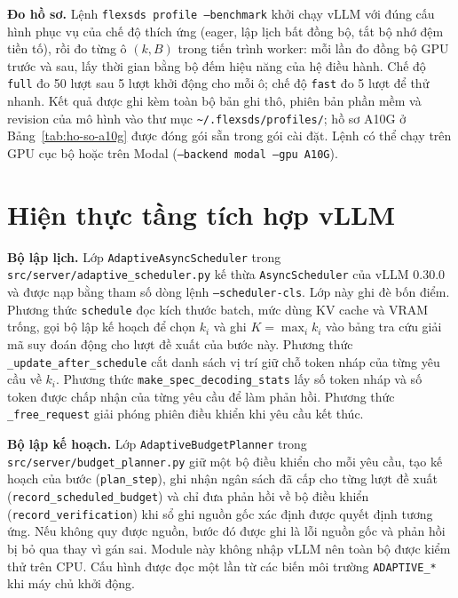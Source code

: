 \textbf{Đo hồ sơ.} Lệnh \texttt{flexsds profile --benchmark} khởi chạy vLLM với đúng cấu hình phục vụ của chế độ thích ứng (eager, lập lịch bất đồng bộ, tắt bộ nhớ đệm tiền tố), rồi đo từng ô $(k, B)$ trong tiến trình worker: mỗi lần đo đồng bộ GPU trước và sau, lấy thời gian bằng bộ đếm hiệu năng của hệ điều hành. Chế độ \texttt{full} đo 50 lượt sau 5 lượt khởi động cho mỗi ô; chế độ \texttt{fast} đo 5 lượt để thử nhanh. Kết quả được ghi kèm toàn bộ bản ghi thô, phiên bản phần mềm và revision của mô hình vào thư mục \texttt{\textasciitilde/.flexsds/profiles/}; hồ sơ A10G ở Bảng~\ref{tab:ho-so-a10g} được đóng gói sẵn trong gói cài đặt. Lệnh có thể chạy trên GPU cục bộ hoặc trên Modal (\texttt{--backend modal --gpu A10G}).

\section{Hiện thực tầng tích hợp vLLM}
\label{sec:ht-tich-hop}

\textbf{Bộ lập lịch.} Lớp \texttt{AdaptiveAsyncScheduler} trong \texttt{src/server/adaptive\_scheduler.py} kế thừa \texttt{AsyncScheduler} của vLLM 0.30.0 và được nạp bằng tham số dòng lệnh \texttt{--scheduler-cls}. Lớp này ghi đè bốn điểm. Phương thức \texttt{schedule} đọc kích thước batch, mức dùng KV cache và VRAM trống, gọi bộ lập kế hoạch để chọn $k_i$ và ghi $K=\max_i k_i$ vào bảng tra cứu giải mã suy đoán động cho lượt đề xuất của bước này. Phương thức \texttt{\_update\_after\_schedule} cắt danh sách vị trí giữ chỗ token nháp của từng yêu cầu về $k_i$. Phương thức \texttt{make\_spec\_decoding\_stats} lấy số token nháp và số token được chấp nhận của từng yêu cầu để làm phản hồi. Phương thức \texttt{\_free\_request} giải phóng phiên điều khiển khi yêu cầu kết thúc.

\textbf{Bộ lập kế hoạch.} Lớp \texttt{AdaptiveBudgetPlanner} trong \texttt{src/server/budget\_planner.py} giữ một bộ điều khiển cho mỗi yêu cầu, tạo kế hoạch của bước (\texttt{plan\_step}), ghi nhận ngân sách đã cấp cho từng lượt đề xuất (\texttt{record\_scheduled\_budget}) và chỉ đưa phản hồi về bộ điều khiển (\texttt{record\_verification}) khi sổ ghi nguồn gốc xác định được quyết định tương ứng. Nếu không quy được nguồn, bước đó được ghi là lỗi nguồn gốc và phản hồi bị bỏ qua thay vì gán sai. Module này không nhập vLLM nên toàn bộ được kiểm thử trên CPU. Cấu hình được đọc một lần từ các biến môi trường \texttt{ADAPTIVE\_*} khi máy chủ khởi động.

